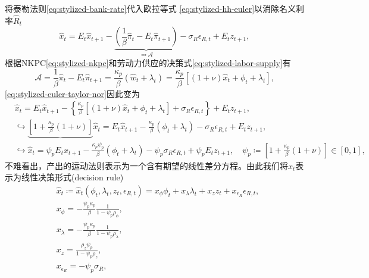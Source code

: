 将泰勒法则\eqref{eq:stylized-bank-rate}代入欧拉等式
\eqref{eq:stylized-hh-euler}以消除名义利率$\hat{R}_{t}$
\begin{equation}
  \label{eq:stylized-euler-taylor-nor}
  \hat{x}_{t} = E_{t} \hat{x}_{t+1}
  - \underbrace{
  \left( \frac{1}{\beta} \hat{\pi}_{t} - E_{t} \hat{\pi}_{t+1} \right)
  }_{\eqqcolon \mathcal{A}}
  - \sigma_{R} \epsilon_{R,t}  + E_{t} z_{t+1},
\end{equation}
根据NKPC\eqref{eq:stylized-nkpc}和劳动力供应的决策式\eqref{eq:stylized-labor-supply}有
\begin{equation}
  \label{eq:stylized-nkpc-labor-supply}
  \mathcal{A} = \frac{1}{\beta} \hat{\pi}_{t} - E_{t} \hat{\pi}_{t+1}
  = \frac{\kappa_{p}}{\beta} \left( \hat{w}_{t} + \lambda_{t} \right)
  = \frac{\kappa_{p}}{\beta}
  \left[\left( 1 + \nu \right) \hat{x}_{t} + \phi_{t} + \lambda_{t}
  \right],
\end{equation}
\eqref{eq:stylized-euler-taylor-nor}因此变为
\begin{equation}
  \label{eq:stylized-euler-taylor-nor-reduce}
\begin{split}
  & \hat{x}_{t} = E_{t} \hat{x}_{t+1} -
  \left\{
  \frac{\kappa_{p}}{\beta}
  \left[
  \left( 1 + \nu \right) \hat{x}_{t} + \phi_{t} + \lambda_{t}
  \right]
  + \sigma_{R} \epsilon_{R,t}
  \right\}
  + E_{t} z_{t+1}, \\
  & \hookrightarrow
  \underbrace{
  \left[
  1 + \frac{\kappa_{p}}{\beta} \left( 1 + \nu \right)
  \right]
  }
  \hat{x}_{t} = E_{t} \hat{x}_{t+1} - \frac{\kappa_{p}}{\beta} \left( \phi_{t} + \lambda_{t} \right) - \sigma_{R} \epsilon_{R,t} + E_{t} z_{t+1}, \\
  & \hookrightarrow
  \hat{x}_{t} = \psi_{p} E_{t} \hat{x}_{t+1} - \frac{\kappa_{p} \psi_{p}}{\beta} \left( \phi_{t} + \lambda_{t} \right) - \psi_{p} \sigma_{R} \epsilon_{R,t} + \psi_{p} E_{t} z_{t+1}, \quad \psi_{p} \coloneqq \left[
  1 + \frac{\kappa_{p}}{\beta} \left( 1 + \nu \right)
  \right] \in [0,1],
\end{split}
\end{equation}
不难看出，产出的运动法则表示为一个含有期望的线性差分方程。由此我们将$\hat{x}_{t}$表示为线性决策形式(decision rule)
\begin{equation}
  \label{eq:stylized-output-decision-rule}
\begin{split}
  & \hat{x}_{t} \coloneqq \hat{x}_{t} \left( \phi_{t}, \lambda_{t}, z_{t}, \epsilon_{R,t} \right)
  = x_{\phi} \phi_{t} + x_{\lambda} \lambda_{t} + x_{z} z_{t} + x_{\epsilon_{R}} \epsilon_{R,t}, \\
  & x_{\phi} = - \frac{\psi_{p} \kappa_{p}}{\beta} \frac{1}{1 - \psi_{p} \rho_{\phi}}, \\
  & x_{\lambda} = - \frac{\psi_{p} \kappa_{p}}{\beta} \frac{1}{1 - \psi_{p} \rho_{\lambda}}, \\
  & x_{z} = \frac{
  \rho_{z} \psi_{p}
  }{
  1 - \psi_{p} \rho_{z}
  }, \\
  & x_{\epsilon_{R}} = - \psi_{p} \sigma_{R},
\end{split}
\end{equation}
